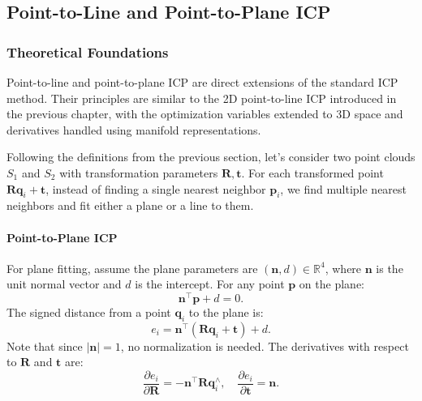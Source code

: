 \subsection{Point-to-Line and Point-to-Plane ICP}
\subsubsection{Theoretical Foundations}
Point-to-line and point-to-plane ICP are direct extensions of the standard ICP method. Their principles are similar to the 2D point-to-line ICP introduced in the previous chapter, with the optimization variables extended to 3D space and derivatives handled using manifold representations. 

Following the definitions from the previous section, let's consider two point clouds $S_1$ and $S_2$ with transformation parameters $\bm{R}, \bm{t}$. For each transformed point $\bm{R} \bm{q}_i + \bm{t}$, instead of finding a single nearest neighbor $\bm{p}_i$, we find multiple nearest neighbors and fit either a plane or a line to them.

\paragraph{Point-to-Plane ICP}  
For plane fitting, assume the plane parameters are $(\bm{n},d) \in \mathbb{R}^4$, where $\bm{n}$ is the unit normal vector and $d$ is the intercept. For any point $\bm{p}$ on the plane:
\begin{equation}\label{key}
	\bm{n}^\top \bm{p} + d = 0.
\end{equation}
The signed distance from a point $\bm{q}_i$ to the plane is:
\begin{equation}\label{key}
	e_i = \bm{n}^\top (\bm{R} \bm{q}_i + \bm{t}) + d.
\end{equation}
Note that since $|\bm{n}|=1$, no normalization is needed. The derivatives with respect to $\bm{R}$ and $\bm{t}$ are:
\begin{equation}\label{key}
	\frac{\partial e_i}{\partial \bm{R}} = -\bm{n}^\top \bm{R} \bm{q}_i^\wedge, \quad \frac{\partial e_i}{\partial \bm{t}} = \bm{n}.
\end{equation}

